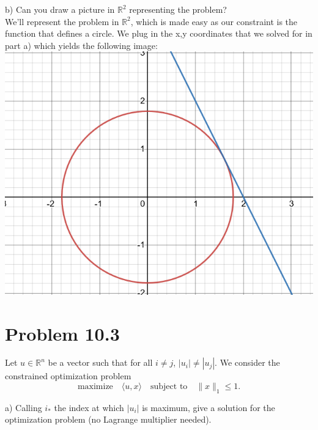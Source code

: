 \documentclass[12pt,twoside]{article}
\newcommand{\R}{\mathbb{R}}
\begin{document}
\newpage
b) Can you draw a picture in $\R^2$ representing the problem? \\
We'll represent the problem in $\R^2$, which is made easy as our constraint is the function that defines a circle. We plug in the x,y coordinates that we solved for in part a) which yields the following image:\\

\includegraphics[scale=1.5]{image.png}
\vspace{5mm}

\section{Problem 10.3}
	Let $u \in \R^n$ be a vector such that for all $i \neq j$, $|u_i| \neq |u_j|$. We consider the constrained optimization problem
	$$
	\text{maximize} \quad \langle u ,x \rangle \quad \text{subject to} \quad \|x\|_1 \leq 1.
	$$

a) Calling $i_*$ the index at which $|u_i|$ is maximum, give a solution for the optimization problem (no Lagrange multiplier needed). \\
 
\end{document}
